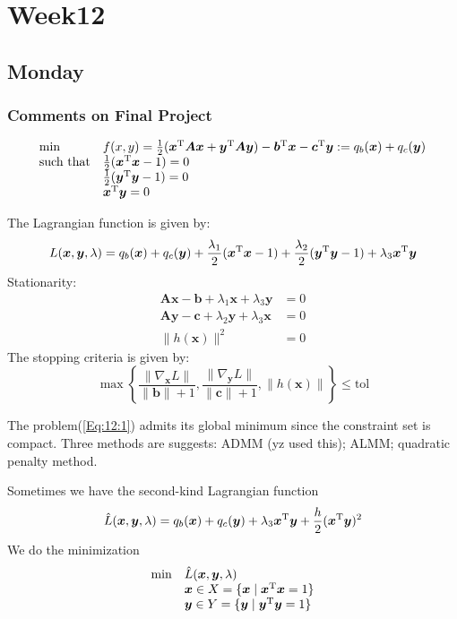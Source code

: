 
\chapter{Week12}

\section{Monday}
\subsection{Comments on Final Project}
\begin{equation}\label{Eq:12:1}
\begin{array}{ll}
\min&f(x,y)=\frac{1}{2}(\bm x\trans\bm A\bm x+\bm y\trans\bm A\bm y) - \bm b\trans\bm x-\bm c\trans\bm y:=q_b(\bm x)+q_c(\bm y)\\
\mbox{such that}&\frac{1}{2}(\bm x\trans\bm x-1)=0\\
&\frac{1}{2}(\bm y\trans\bm y-1)=0\\
&\bm x\trans\bm y=0
\end{array}
\end{equation}

The Lagrangian function is given by:
\begin{equation}
L(\bm x,\bm y,\lambda)=q_b(\bm x)+q_c(\bm y)+\frac{\lambda_1}{2}(\bm x^{\mathrm T}\bm x-1)
+
\frac{\lambda_2}{2}(\bm y^{\mathrm T}\bm y-1)
+
\lambda_3\bm x^{\mathrm T}\bm y
\end{equation}
Stationarity:
\begin{align*}
\bm{Ax}-\bm b+\lambda_1\bm x+\lambda_3\bm y&=0\\
\bm{Ay}-\bm c+\lambda_2\bm y+\lambda_3\bm x&=0\\
\|h(\bm x)\|^2&=0
\end{align*}
The stopping criteria is given by:
\[
\max\left\{
\frac{\|\nabla_{\bm x}L\|}{\|\bm b\|+1},
\frac{\|\nabla_{\bm y}L\|}{\|\bm c\|+1},
\|h(\bm x)\|
\right\}\le\mbox{tol}
\]

The problem(\ref{Eq:12:1}) admits its global minimum since the constraint set is compact. Three methods are suggests: ADMM (yz used this); ALMM; quadratic penalty method.

Sometimes we have the second-kind Lagrangian function
\[
\hat L(\bm x,\bm y,\lambda) = q_b(\bm x)+q_c(\bm y)+\lambda_3\bm x^{\mathrm T}\bm y+\frac{h}{2}(\bm x^{\mathrm T}\bm y)^2
\]
We do the minimization
\begin{equation}
\begin{array}{ll}
\min&\hat L(\bm x,\bm y,\lambda)\\
&\bm x\in X=\{\bm x\mid \bm x^{\mathrm T}\bm x=1\}\\
&\bm y\in Y=\{\bm y\mid \bm y^{\mathrm T}\bm y=1\}\\
\end{array}
\end{equation}

